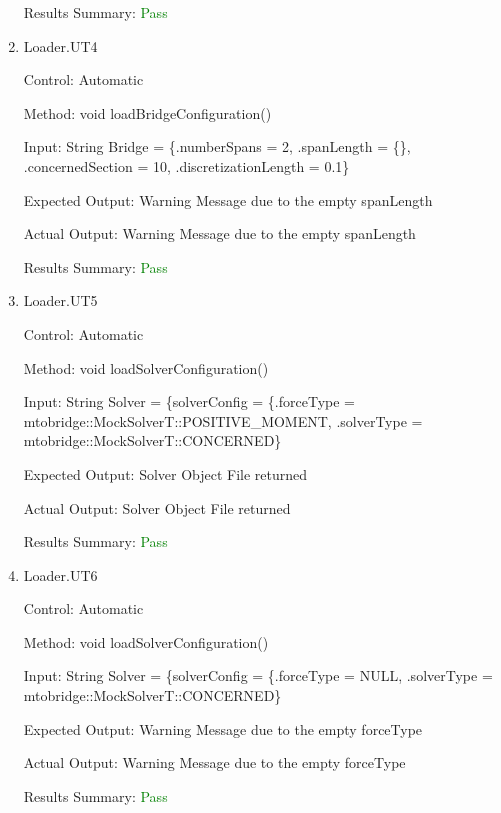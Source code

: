 \documentclass[12pt, titlepage]{article}
\begin{document}
\begin{enumerate}
    Results Summary: \textcolor{green} {Pass}

    \item{Loader.UT4\\}
    
    Control: Automatic
    
    Method:  void loadBridgeConfiguration()
    
    Input: String Bridge = \{.numberSpans = 2,
                         .spanLength = \{\},
                         .concernedSection = 10,
                         .discretizationLength = 0.1\}
    
    Expected Output: Warning Message due to the empty spanLength

    Actual Output: Warning Message due to the empty spanLength

    Results Summary:  \textcolor{green} {Pass}

    \item{Loader.UT5\\}
    
    Control: Automatic
    
    Method:  void loadSolverConfiguration()
    
    Input: String Solver = \{solverConfig = \{.forceType = mtobridge::MockSolverT::POSITIVE\_MOMENT,
                         .solverType = mtobridge::MockSolverT::CONCERNED\}
    
    Expected Output: Solver Object File returned 

    Actual Output: Solver Object File returned 

    Results Summary: \textcolor{green} {Pass}

    \item{Loader.UT6\\}
    
    Control: Automatic
    
    Method:  void loadSolverConfiguration()
    
    Input: String Solver = \{solverConfig = \{.forceType = NULL,
                         .solverType = mtobridge::MockSolverT::CONCERNED\}
    
    Expected Output: Warning Message due to the empty forceType

    Actual Output: Warning Message due to the empty forceType

    Results Summary: \textcolor{green} {Pass}

    
\end{enumerate}
\end{document}
